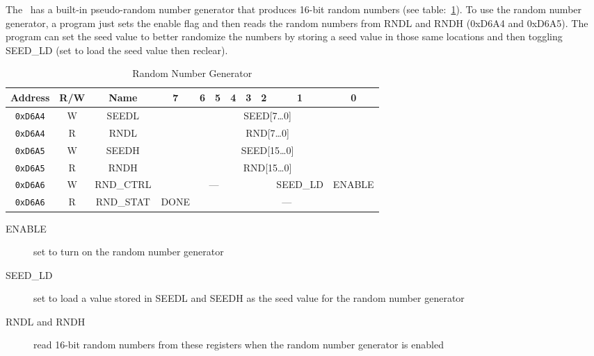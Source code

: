 The \jr\ has a built-in pseudo-random number generator that produces 16-bit random numbers (see table:~\ref{tab:rng_reg}). To use the random number generator, a program just sets the enable flag and then reads the random numbers from RNDL and RNDH (0xD6A4 and 0xD6A5). The program can set the seed value to better randomize the numbers by storing a seed value in those same locations and then toggling SEED\_LD (set to load the seed value then reclear).

\begin{table}[ht]
    \begin{center}
        \begin{tabular}{|c|c|c|c|c|c|c|c|c|c|c|} \hline
            Address & R/W & Name & 7 & 6 & 5 & 4 & 3 & 2 & 1 & 0 \\\hline\hline
            \verb+0xD6A4+ & W & SEEDL & \multicolumn{8}{|c|}{SEED[7\ldots 0]} \\ \hline
            \verb+0xD6A4+ & R & RNDL & \multicolumn{8}{|c|}{RND[7\ldots 0]} \\ \hline
            \verb+0xD6A5+ & W & SEEDH & \multicolumn{8}{|c|}{SEED[15\ldots 0]} \\ \hline
            \verb+0xD6A5+ & R & RNDH &  \multicolumn{8}{|c|}{RND[15\ldots 0]} \\ \hline

            \verb+0xD6A6+ & W & RND\_CTRL & \multicolumn{6}{|c|}{---} & SEED\_LD & ENABLE \\ \hline
            \verb+0xD6A6+ & R & RND\_STAT & DONE & \multicolumn{7}{|c|}{---} \\ \hline

        \end{tabular}
    \end{center}
    \caption{Random Number Generator}
    \label{tab:rng_reg}
\end{table}

\begin{description}
    \item[ENABLE] set to turn on the random number generator

    \item[SEED\_LD] set to load a value stored in SEEDL and SEEDH as the seed value for the random number generator

    \item[RNDL and RNDH] read 16-bit random numbers from these registers when the random number generator is enabled
\end{description}

